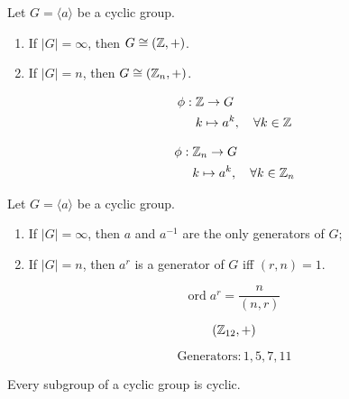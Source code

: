 \begin{frame}
  \begin{theorem}
    Let $G = \langle a \rangle$ be a cyclic group.
    \begin{enumerate}[(1)]
      \setlength{\itemsep}{6pt}
      \item If $|G| = \infty$, then $G \cong (\mathbb{Z}, +)$.
      \item If $|G| = n$, then $G \cong (\mathbb{Z}_{n}, +)$.
    \end{enumerate}
  \end{theorem}

  \pause
  \begin{align*}
    \phi:\; &\mathbb{Z} \to G \\
    &k \mapsto a^{k}, \quad \forall k \in \mathbb{Z}
  \end{align*}

  \pause
  \begin{align*}
    \phi:\; &\mathbb{Z}_{n} \to G \\
    &k \mapsto a^{k}, \quad \forall k \in \mathbb{Z}_{n}
  \end{align*}
\end{frame}

\begin{frame}
  \begin{theorem}
    Let $G = \langle a \rangle$ be a cyclic group.
    \begin{enumerate}[<+->][(1)]
      \setlength{\itemsep}{6pt}
      \item If $|G| = \infty$, then $a$ and $a^{-1}$ are the only generators of $G$;
      \item If $|G| = n$, then $a^{r}$ is a generator of $G$ iff $(r, n) = 1$.
    \end{enumerate}
  \end{theorem}

  \pause
  \[
    \text{ord}\; a^{r} = \frac{n}{(n, r)}
  \]
\end{frame}

\begin{frame}{}
  \[
    (\mathbb{Z}_{12}, +)
  \]

  \[
    \text{Generators}: 1, 5, 7, 11
  \]
\end{frame}

\begin{frame}{}
  \begin{theorem}
    Every subgroup of a cyclic group is cyclic.
  \end{theorem}
\end{frame}
